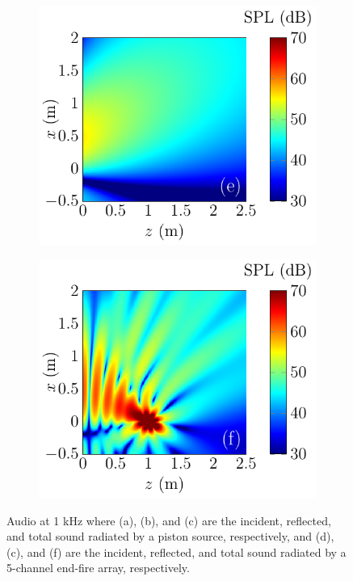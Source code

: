 \begin{figure}[!htb]
\begin{subfigure}{0.32\textwidth}
    \end{subfigure}
    \begin{subfigure}{0.32\textwidth}
        \centering
        \includegraphics[width = \textwidth]{fig/ComputeEndfireReflection_1000Hz_Reflected_211013H.pdf}
    \end{subfigure}
    \begin{subfigure}{0.32\textwidth}
        \centering
        \includegraphics[width = \textwidth]{fig/ComputeEndfireReflection_1000Hz_Total_211013I.pdf}
    \end{subfigure}
    \caption{Audio  at 1 kHz where (a), (b), and (c) are the incident, reflected, and total sound radiated by a piston source, respectively, and (d), (c), and (f) are the incident, reflected, and total sound radiated by a 5-channel end-fire array, respectively.}
    \label{fig:reflection:traditional_source}
\end{figure}

